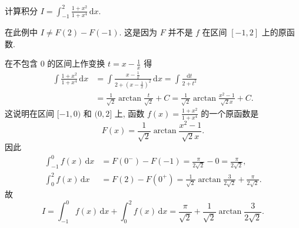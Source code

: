 \documentclass[../../main.tex]{subfiles}%
\begin{document}
\begin{example}
计算积分 $I=\int_{-1}^{2}\frac{1+x^{2}}{1+x^{4}}\,\mathrm{d}x$.
\end{example}
\begin{remark}
在此例中 $I\neq F(2)-F(-1)$. 这是因为 $F$ 并不是 $f$ 在区间 $[-1,2]$ 上的原函数.
\end{remark}
\begin{solution}
在不包含 $0$ 的区间上作变换 $t=x-\frac{1}{x}$ 得
\begin{align*}
\int\frac{1+x^{2}}{1+x^{4}}\,\mathrm{d}x&=\int\frac{x-\frac{1}{x}}{2+\left(x-\frac{1}{x}\right)^{2}}\,\mathrm{d}x=\int\frac{\mathrm{d}t}{2+t^{2}}\\
&=\frac{1}{\sqrt{2}}\arctan\frac{t}{\sqrt{2}}+C=\frac{1}{\sqrt{2}}\arctan\frac{x^{2}-1}{\sqrt{2}x}+C.
\end{align*}
这说明在区间 $[-1,0)$ 和 $(0,2]$ 上, 函数 $f(x)=\frac{1+x^{2}}{1+x^{4}}$ 的一个原函数是
$$F(x)=\frac{1}{\sqrt{2}}\arctan\frac{x^{2}-1}{\sqrt{2}x}.$$
因此
\begin{align*}
\int_{-1}^{0}f(x)\,\mathrm{d}x&=F(0^{-})-F(-1)=\frac{\pi}{2\sqrt{2}}-0=\frac{\pi}{2\sqrt{2}},\\
\int_{0}^{2}f(x)\,\mathrm{d}x&=F(2)-F(0^{+})=\frac{1}{\sqrt{2}}\arctan\frac{3}{2\sqrt{2}}+\frac{\pi}{2\sqrt{2}}.
\end{align*}
故
$$I=\int_{-1}^{0}f(x)\,\mathrm{d}x+\int_{0}^{2}f(x)\,\mathrm{d}x=\frac{\pi}{\sqrt{2}}+\frac{1}{\sqrt{2}}\arctan\frac{3}{2\sqrt{2}}.$$

\end{solution}
\end{document}
